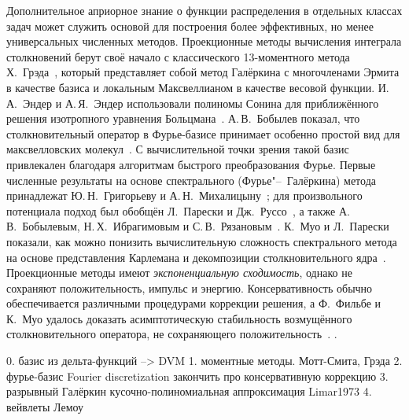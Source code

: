 Дополнительное априорное знание о функции распределения в отдельных классах задач может служить
основой для построения более эффективных, но менее универсальных численных методов.
Проекционные методы вычисления интеграла столкновений берут своё начало с классического
13-моментного метода Х.~Грэда~\autocite{Grad1949}, который представляет собой метод Галёркина
с многочленами Эрмита в качестве базиса и локальным Максвеллианом в качестве весовой функции.
И.\,А.~Эндер и А.\,Я.~Эндер использовали полиномы Сонина
для приближённого решения изотропного уравнения Больцмана~\autocite{Ender1970}.
А.\,В.~Бобылев показал, что столкновительный оператор в Фурье-базисе принимает особенно простой вид
для максвелловских молекул~\autocite{Bobylev1975}.
С вычислительной точки зрения такой базис привлекален благодаря алгоритмам быстрого преобразования Фурье.
Первые численные результаты на основе спектрального (Фурье"--~Галёркина) метода принадлежат
Ю.\,Н.~Григорьеву и А.\,Н.~Михалицыну~\autocite{Grigoriev1983};
для произвольного потенциала подход был обобщён Л.~Парески и Дж.~Руссо~\autocite{Pareschi2000method},
а также А.\,В.~Бобылевым, Н.\,Х.~Ибрагимовым и С.\,В.~Рязановым~\autocite{Rjasanow1999, Ibragimov2002}.
К.~Муо и Л.~Парески показали, как можно понизить вычислительную сложность спектрального метода
на основе представления Карлемана и декомпозиции столкновительного ядра~\autocite{Pareschi2006}.
Проекционные методы имеют \emph{экспоненциальную сходимость}, однако не сохраняют положительность, импульс и энергию.
Консервативность обычно обеспечивается различными процедурами коррекции решения,
а Ф.~Фильбе и К.~Муо удалось доказать асимптотическую стабильность возмущённого столкновительного оператора,
не сохраняющего положительность~\autocite{Filbet2011}.
.



0. базис из дельта-функций --> DVM
1. моментные методы. Мотт-Смита, Грэда
2. фурье-базис Fourier discretization закончить про консервативную коррекцию
3. разрывный Галёркин кусочно-полиномиальная аппроксимация Limar1973
4. вейвлеты Лемоу




